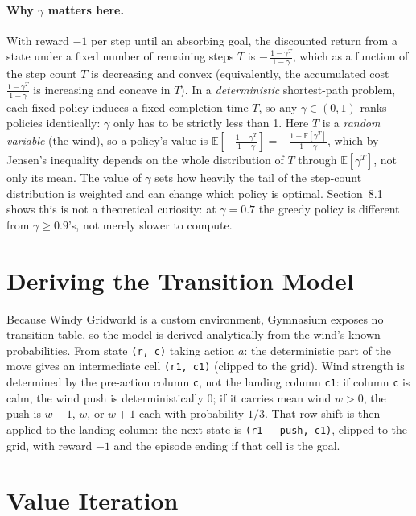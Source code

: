 \documentclass[11pt]{article}
\begin{document}
\paragraph{Why $\gamma$ matters here.} With reward $-1$ per step
until an absorbing goal, the discounted return from a state under a fixed
number of remaining steps $T$ is $-\,\frac{1-\gamma^T}{1-\gamma}$, which as a
function of the step count $T$ is decreasing and convex (equivalently, the
accumulated cost $\frac{1-\gamma^T}{1-\gamma}$ is increasing and concave in
$T$). In a \emph{deterministic} shortest-path problem,
each fixed policy induces a fixed completion time $T$, so any $\gamma\in(0,1)$ ranks policies
identically: $\gamma$ only has to be strictly less than 1. Here $T$ is a
\emph{random variable} (the wind), so a policy's value is
$\mathbb{E}\!\left[-\frac{1-\gamma^T}{1-\gamma}\right]=-\frac{1-\mathbb{E}[\gamma^T]}{1-\gamma}$,
which by Jensen's inequality depends on the whole distribution of $T$ through
$\mathbb{E}[\gamma^T]$, not only its mean. The value of $\gamma$ sets how
heavily the tail of the step-count distribution is weighted and can change
which policy is optimal. Section~8.1 shows this is not a theoretical curiosity: at
$\gamma=0.7$ the greedy policy is different from $\gamma\ge0.9$'s,
not merely slower to compute.

\section{Deriving the Transition Model}

Because Windy Gridworld is a custom environment, Gymnasium exposes no
transition table, so the model is derived analytically from the wind's known
probabilities. From state \texttt{(r, c)} taking action
$a$: the deterministic part of the move gives an intermediate cell
\texttt{(r1, c1)} (clipped to the grid). Wind strength is determined by the
pre-action column \texttt{c}, not the landing column \texttt{c1}: if column
\texttt{c} is calm, the wind push is deterministically $0$; if it carries
mean wind $w>0$, the push is $w-1$, $w$, or $w+1$ each with probability
$1/3$. That row shift is then applied to the landing column: the next state
is \texttt{(r1 - push, c1)}, clipped to the grid, with reward $-1$ and the
episode ending if that cell is the goal.

\section{Value Iteration}
\end{document}
